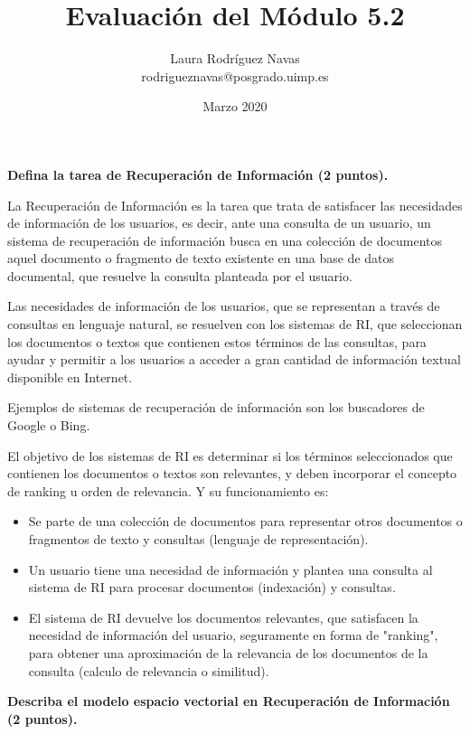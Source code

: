 \documentclass[11pt]{exam}
\title{Evaluación del Módulo 5.2}
\author{Laura Rodríguez Navas \\ rodrigueznavas@posgrado.uimp.es}
\date{Marzo 2020}
\begin{document}
	
\maketitle

\begin{questions}

{\bf \question Defina la tarea de Recuperación de Información (2 puntos).}

La Recuperación de Información es la tarea que trata de satisfacer las necesidades de información de los usuarios, es decir, ante una consulta de un usuario, un sistema de recuperación de información busca en una colección de documentos aquel documento o fragmento de texto existente en una base de datos documental, que resuelve la consulta planteada por el usuario. 

Las necesidades de información de los usuarios, que se representan a través de consultas en lenguaje natural, se resuelven con los sistemas de RI, que seleccionan los documentos o textos que contienen estos términos de las consultas, para ayudar y permitir a los usuarios a acceder a gran cantidad de información textual disponible en Internet.

Ejemplos de sistemas de recuperación de información son los buscadores de Google o Bing.

El objetivo de los sistemas de RI es determinar si los términos seleccionados que contienen los documentos o textos son relevantes, y deben incorporar el concepto de ranking u orden de relevancia. Y su funcionamiento es:

\begin{itemize}
	\item Se parte de una colección de documentos para representar otros documentos o fragmentos de texto y consultas (lenguaje de representación).
	\item Un usuario tiene una necesidad de información y plantea una consulta al sistema de RI para procesar documentos (indexación) y consultas.
	\item El sistema de RI devuelve los documentos relevantes, que satisfacen la necesidad de información del usuario, seguramente en forma de "ranking", para obtener una aproximación de la relevancia de los documentos de la consulta (calculo de relevancia o similitud).
\end{itemize}


{\bf \question Describa el modelo espacio vectorial en Recuperación de Información (2 puntos).}


\end{questions}
\end{document}
